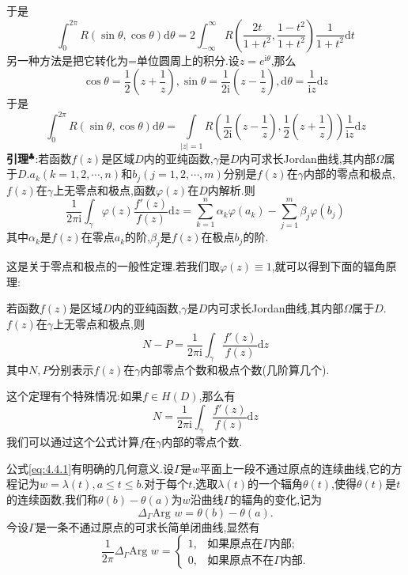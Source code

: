 于是
$$
\int_0^{2\pi}R(\sin\theta,\cos\theta)\mathrm{d}\theta=2\int_{-\infty}^{\infty}R(\frac{2t}{1+t^2},\frac{1-t^2}{1+t^2})\frac{1}{1+t^2}\mathrm{d}t
$$
另一种方法是把它转化为=单位圆周上的积分.设$z=e^{\mathrm{i}\theta}$,那么
$$
\cos\theta=\frac{1}{2}\left(z+\frac{1}{z}\right),\sin\theta=\frac{1}{2\mathrm{i}}\left(z-\frac{1}{z}\right),\mathrm{d}\theta=\frac{1}{\mathrm{i}z}\mathrm{d}z
$$
于是
$$
\int_0^{2\pi}R(\sin\theta,\cos\theta)\mathrm{d}\theta=\int\limits_{|z|=1}R(\frac{1}{2\mathrm{i}}\left(z-\frac{1}{z}\right),\frac{1}{2}\left(z+\frac{1}{z}\right))\frac{1}{\mathrm{i}z}\mathrm{d}z
$$
\qquad \textbf{引理}$^\clubsuit$:若函数$f(z)$是区域$D$内的亚纯函数,$\gamma$是$D$内可求长Jordan曲线,其内部$\Omega$属于$D$.$a_k(k=1,2,\cdots,n)$和$b_j(j=1,2,\cdots,m)$分别是$f(z)$在$\gamma$内部的零点和极点,
$f(z)$在$\gamma$上无零点和极点,函数$\varphi (z)$在$D$内解析.则
$$
\frac{1}{2\pi \mathrm{i} }\int_{\gamma}\varphi (z)\frac{f'(z)}{f(z)}\mathrm{d}z=\sum^n_{k=1}\alpha _k\varphi (a_k)-\sum^m_{j=1}\beta _j\varphi (b_j)
$$
其中$\alpha_k $是$f(z)$在零点$a_k$的阶,$\beta_j $是$f(z)$在极点$b_j$的阶.\par
这是关于零点和极点的一般性定理.若我们取$\varphi (z)\equiv 1$,就可以得到下面的辐角原理:
\begin{tcolorbox}[colback=KuangNei,colframe=BianKuang,title=\textbf{辐角原理},sharpish corners]
    若函数$f(z)$是区域$D$内的亚纯函数,$\gamma$是$D$内可求长Jordan曲线,其内部$\Omega$属于$D$.$f(z)$在$\gamma$上无零点和极点,则
    $$
    N-P=\frac{1}{2\pi \mathrm{i} }\int_{\gamma}\frac{f'(z)}{f(z)}\mathrm{d}z
    $$
    其中$N,P$分别表示$f(z)$在$\gamma$内部零点个数和极点个数(几阶算几个).
\end{tcolorbox}
这个定理有个特殊情况:如果$f\in H(D)$,那么有
\begin{equation}
    N=\frac{1}{2\pi \mathrm{i} }\int_{\gamma}\frac{f'(z)}{f(z)}\mathrm{d}z
    \label{eq:4.4.1}
\end{equation}
我们可以通过这个公式计算$f$在$\gamma$内部的零点个数.\par
公式\eqref{eq:4.4.1}有明确的几何意义.设$\Gamma$是$w$平面上一段不通过原点的连续曲线,它的方程记为$w=\lambda(t),a\leq t\leq b.$对于每个$t$,选取$\lambda(t)$的一个辐角$\theta(t)$,使得$\theta(t)$是$t$的连续函数,我们称$\theta(b)-\theta(a)$为$w$沿曲线$\Gamma$的辐角的变化,记为
$$
\Delta_\Gamma \text{Arg } w = \theta(b)-\theta(a).
$$
今设$\Gamma$是一条不通过原点的可求长简单闭曲线,显然有
$$
\frac{1}{2\pi}\Delta_\Gamma \text{Arg } w = 
\begin{cases}
1,&\text{如果原点在}\Gamma\text{内部};\\
0,&\text{如果原点不在}\Gamma\text{内部}.
\end{cases}
$$

